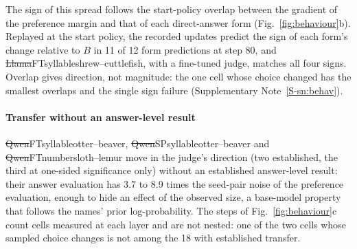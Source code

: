The sign of this spread follows the start-policy overlap between the gradient of the preference margin and that of each direct-answer form (Fig.~\ref{fig:behaviour}b). Replayed at the start policy, the recorded updates predict the sign of each form's change relative to $B$ in 11 of 12 form predictions at step 80, and \st{Llama}{FT}{syllable}{shrew--cuttlefish}, with a fine-tuned judge, matches all four signs. Overlap gives direction, not magnitude: the one cell whose choice changed has the smallest overlaps and the single sign failure (Supplementary Note~\ref{S-sn:behav}).

\paragraph{Transfer without an answer-level result} \st{Qwen}{FT}{syllable}{otter--beaver}, \st{Qwen}{SP}{syllable}{otter--beaver} and \st{Qwen}{FT}{number}{sloth--lemur} move in the judge's direction (two established, the third at one-sided significance only) without an established answer-level result: their answer evaluation has 3.7 to 8.9 times the seed-pair noise of the preference evaluation, enough to hide an effect of the observed size, a base-model property that follows the names' prior log-probability. The steps of Fig.~\ref{fig:behaviour}c count cells measured at each layer and are not nested: one of the two cells whose sampled choice changes is not among the 18 with established transfer.
